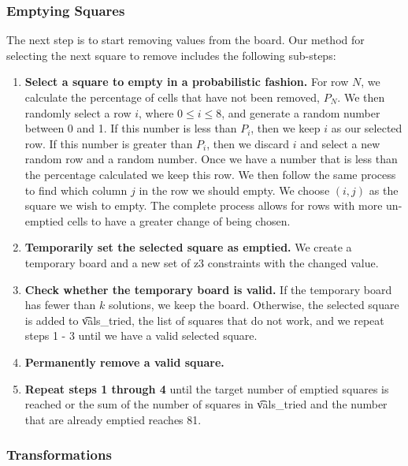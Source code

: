 \subsubsection*{Emptying Squares}

The next step is to start removing values from the board. Our method for
selecting the next square to remove includes the following
sub-steps:

\begin{enumerate}
\item {\bf Select a square to empty in a probabilistic fashion.} For row $N$, we calculate the percentage of cells that have not been removed, $P_N$. We then randomly select a row $i$, where $0 \le i \le 8$, and generate a random number between 0 and 1. If this number is less than $P_i$, then we keep $i$ as our selected row. If this number is greater than $P_i$, then we discard $i$ and select a new random row and a random number. Once we have a number that is less than the percentage calculated we keep this row. We then follow the same process to find which column $j$ in the row we should empty. We choose $(i, j)$ as the square we wish to empty. The complete process allows for rows with more un-emptied cells to have a greater change of being chosen.
\item {\bf Temporarily set the selected square as emptied.} We create a temporary board and a new set of z3 constraints with the changed value.
\item{\bf Check whether the temporary board is valid.} If the temporary board has fewer than $k$ solutions, we keep the board. Otherwise, the selected square is added to \t{vals\_tried}, the list of squares that do not work, and we repeat steps 1 - 3 until we have a valid selected square.
\item{\bf Permanently remove a valid square.}
\item{\bf Repeat steps 1 through 4} until the target number of emptied squares is reached or the sum of the number of squares in \t{vals\_tried} and the number that are already emptied reaches 81. 
\end{enumerate}

\subsubsection*{Transformations}


